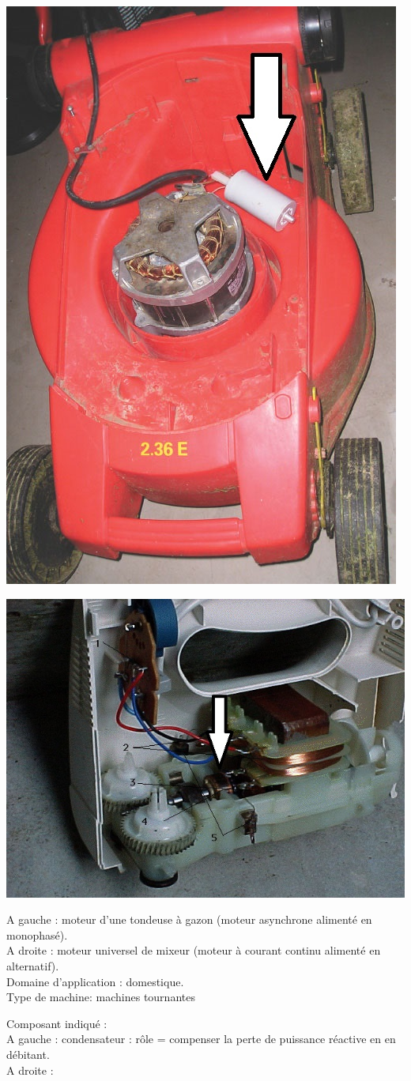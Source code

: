 \begin{questions}
{\begin{minipage}{0.5\textwidth}
\centering
\includegraphics[width= 0.5 \textwidth]{./img/tondeuse}
\end{minipage}
\begin{minipage}{0.5\textwidth}
\centering
\includegraphics[width= 0.7 \textwidth]{./img/mixeur}
\end{minipage}
}
\begin{solution}
A gauche : moteur d'une tondeuse à gazon (moteur asynchrone alimenté en monophasé).\\
A droite : moteur universel de mixeur (moteur à courant continu alimenté en alternatif).\\
Domaine d'application : domestique.\\

Type de machine: machines tournantes

Composant indiqué :\\
A gauche : condensateur : rôle = compenser la perte de puissance réactive en en débitant.\\
A droite : 
\end{solution}


\end{questions}
